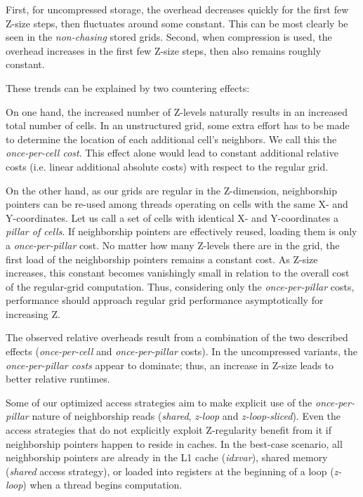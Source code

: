 First, for uncompressed storage, the overhead decreases quickly for the first few Z-size steps, then fluctuates around some constant. This can be most clearly be seen in the \emph{non-chasing} stored grids. Second, when compression is used, the overhead increases in the first few Z-size steps, then also remains roughly constant.

These trends can be explained by two countering effects:

On one hand, the increased number of Z-levels naturally results in an increased total number of cells. In an unstructured grid, some extra effort has to be made to determine the location of each additional cell's neighbors. We call this the \emph{once-per-cell cost}. This effect alone would lead to constant additional relative costs (i.e. linear additional absolute costs) with respect to the regular grid.

On the other hand, as our grids are regular in the Z-dimension, neighborship pointers can be re-used among threads operating on cells with the same X- and Y-coordinates. Let us call a set of cells with identical X- and Y-coordinates a \emph{pillar of cells}. If neighborship pointers are effectively reused, loading them is only a \emph{once-per-pillar} cost. No matter how many Z-levels there are in the grid, the first load of the neighborship pointers remains a constant cost. As Z-size increases, this constant becomes vanishingly small in relation to the overall cost of the regular-grid computation. Thus, considering only the \emph{once-per-pillar} costs, performance should approach regular grid performance asymptotically for increasing Z. 

The observed relative overheads result from a combination of the two described effects (\emph{once-per-cell} and \emph{once-per-pillar} costs). In the uncompressed variants, the \emph{once-per-pillar costs} appear to dominate; thus, an increase in Z-size leads to better relative runtimes.

Some of our optimized access strategies aim to make explicit use of the \emph{once-per-pillar} nature of neighborship reads (\emph{shared}, \emph{z-loop} and \emph{z-loop-sliced}). Even the access strategies that do not explicitly exploit Z-regularity benefit from it if neighborship pointers happen to reside in caches.  In the best-case scenario, all neighborship pointers are already in the L1 cache (\emph{idxvar}), shared memory (\emph{shared} access strategy), or loaded into registers at the beginning of a loop (\emph{z-loop}) when a thread begins computation.

